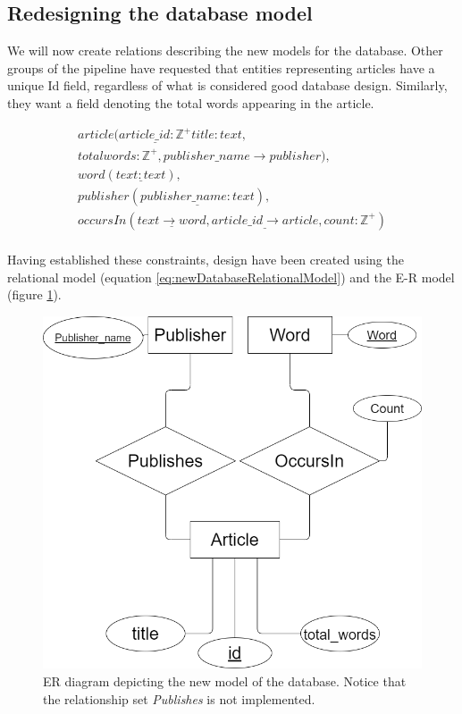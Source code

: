 \subsection{Redesigning the database model}\label{databaseModelRedesignNF}
We will now create relations describing the new models for the database.
Other groups of the \knox{} pipeline have requested that entities representing articles have a unique Id field, regardless of what is considered good database design.
Similarly, they want a field denoting the total words appearing in the article.

\begin{equation}\label{eq:newDatabaseRelationalModel}
    \begin{split}
        article(\underline{article\_id: \mathbb{Z^+}} title:text,\\ totalwords:\mathbb{Z^+}, publisher\_name \rightarrow publisher), \\
        word(\underline{text:text}),\\
        publisher(\underline{publisher\_name:text}),\\
        occursIn(\underline{text \rightarrow word}, \underline{article\_id \rightarrow article}, count:\mathbb{Z^+})\\
    \end{split}
\end{equation}


Having established these constraints, design have been created using the relational model (equation \ref{eq:newDatabaseRelationalModel}) and the E-R model (figure \ref{fig:newdatabaseRedesignER}).

\begin{figure}[H]
    \centering
    \includegraphics[scale=0.35]{Images/new ER.drawio.png}
    \caption{ER diagram depicting the new model of the database. Notice that the relationship set \textit{Publishes} is not implemented.}
    \label{fig:newdatabaseRedesignER}
\end{figure}